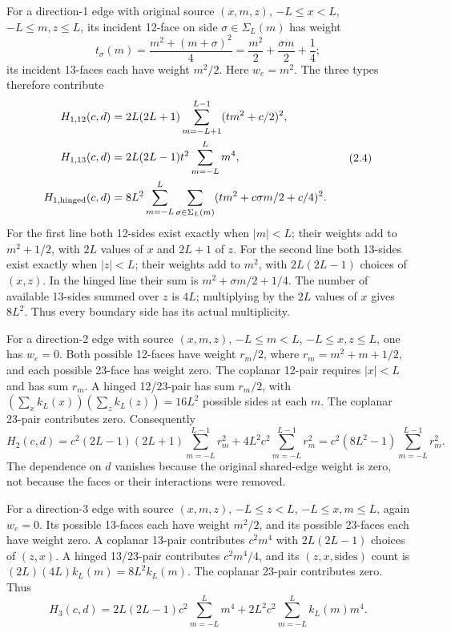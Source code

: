 \documentclass[
  11pt,
]{article}
\begin{document}
For a direction-1 edge with original source \((x,m,z)\), \(-L\le x<L\),
\(-L\le m,z\le L\), its incident 12-face on side
\(\sigma\in\Sigma_L(m)\) has weight \[
 t_\sigma(m)=\frac{m^2+(m+\sigma)^2}{4}
       =\frac{m^2}{2}+\frac{\sigma m}{2}+\frac14;
\tag{2.3}
\] its incident 13-faces each have weight \(m^2/2\). Here \(w_e=m^2\).
The three types therefore contribute \[
\begin{split}
 H_{1,12}(c,d)&=2L(2L+1)
       \sum_{m=-L+1}^{L-1}(t m^2+c/2)^2,\\
 H_{1,13}(c,d)&=2L(2L-1)t^2\sum_{m=-L}^{L}m^4,\\
 H_{1,\rm hinged}(c,d)&=8L^2\sum_{m=-L}^L
       \sum_{\sigma\in\Sigma_L(m)}
               (t m^2+c\sigma m/2+c/4)^2.
\end{split}
\tag{2.4}
\] For the first line both 12-sides exist exactly when \(|m|<L\); their
weights add to \(m^2+1/2\), with \(2L\) values of \(x\) and \(2L+1\) of
\(z\). For the second line both 13-sides exist exactly when \(|z|<L\);
their weights add to \(m^2\), with \(2L(2L-1)\) choices of \((x,z)\). In
the hinged line their sum is \(m^2+\sigma m/2+1/4\). The number of
available 13-sides summed over \(z\) is \(4L\); multiplying by the
\(2L\) values of \(x\) gives \(8L^2\). Thus every boundary side has its
actual multiplicity.

For a direction-2 edge with source \((x,m,z)\), \(-L\le m<L\),
\(-L\le x,z\le L\), one has \(w_e=0\). Both possible 12-faces have
weight \(r_m/2\), where \(r_m=m^2+m+1/2\), and each possible 23-face has
weight zero. The coplanar 12-pair requires \(|x|<L\) and has sum
\(r_m\). A hinged 12/23-pair has sum \(r_m/2\), with
\((\sum_xk_L(x))(\sum_zk_L(z))=16L^2\) possible sides at each \(m\). The
coplanar 23-pair contributes zero. Consequently \[
 H_2(c,d)=c^2(2L-1)(2L+1)\sum_{m=-L}^{L-1}r_m^2
        +4L^2c^2\sum_{m=-L}^{L-1}r_m^2
        =c^2(8L^2-1)\sum_{m=-L}^{L-1}r_m^2.
\tag{2.5}
\] The dependence on \(d\) vanishes because the original shared-edge
weight is zero, not because the faces or their interactions were
removed.

For a direction-3 edge with source \((x,m,z)\), \(-L\le z<L\),
\(-L\le x,m\le L\), again \(w_e=0\). Its possible 13-faces each have
weight \(m^2/2\), and its possible 23-faces each have weight zero. A
coplanar 13-pair contributes \(c^2m^4\) with \(2L(2L-1)\) choices of
\((z,x)\). A hinged 13/23-pair contributes \(c^2m^4/4\), and its
\((z,x,\text{sides})\) count is \((2L)(4L)k_L(m)=8L^2k_L(m)\). The
coplanar 23-pair contributes zero. Thus \[
 H_3(c,d)=2L(2L-1)c^2\sum_{m=-L}^Lm^4
       +2L^2c^2\sum_{m=-L}^Lk_L(m)m^4.
\tag{2.6}
\]
\end{document}

